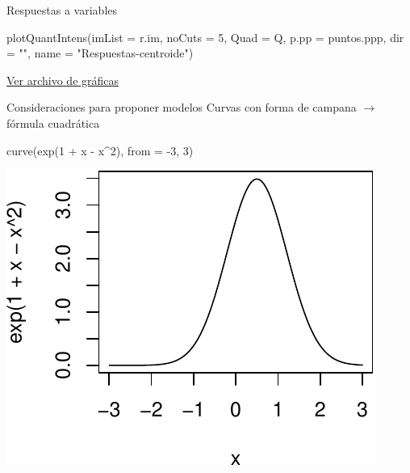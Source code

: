 \documentclass[
  11pt,
  ignorenonframetext,
]{beamer}
\newenvironment{Shaded}{}{}
\newcommand{\AttributeTok}[1]{\textcolor[rgb]{0.49,0.56,0.16}{#1}}
\newcommand{\DecValTok}[1]{\textcolor[rgb]{0.25,0.63,0.44}{#1}}
\newcommand{\FunctionTok}[1]{\textcolor[rgb]{0.02,0.16,0.49}{#1}}
\newcommand{\NormalTok}[1]{#1}
\newcommand{\SpecialCharTok}[1]{\textcolor[rgb]{0.25,0.44,0.63}{#1}}
\newcommand{\StringTok}[1]{\textcolor[rgb]{0.25,0.44,0.63}{#1}}
\begin{document}
\begin{frame}[fragile]{Respuestas a variables}
\protect\hypertarget{respuestas-a-variables}{}
\begin{Shaded}
\begin{Highlighting}[]
\FunctionTok{plotQuantIntens}\NormalTok{(}\AttributeTok{imList =}\NormalTok{ r.im,}
                \AttributeTok{noCuts =} \DecValTok{5}\NormalTok{,}
                \AttributeTok{Quad =}\NormalTok{ Q,}
                \AttributeTok{p.pp =}\NormalTok{ puntos.ppp,}
                \AttributeTok{dir =} \StringTok{""}\NormalTok{,}
                \AttributeTok{name =} \StringTok{"Respuestas{-}centroide"}\NormalTok{)}
\end{Highlighting}
\end{Shaded}

\href{Respuestas-centroide.pdf}{Ver archivo de gráficas}
\end{frame}

\begin{frame}[fragile]{Consideraciones para proponer modelos}
\protect\hypertarget{consideraciones-para-proponer-modelos}{}
Curvas con forma de campana \(\rightarrow\) fórmula cuadrática

\begin{Shaded}
\begin{Highlighting}[]
\FunctionTok{curve}\NormalTok{(}\FunctionTok{exp}\NormalTok{(}\DecValTok{1} \SpecialCharTok{+}\NormalTok{ x }\SpecialCharTok{{-}}\NormalTok{ x}\SpecialCharTok{\^{}}\DecValTok{2}\NormalTok{), }\AttributeTok{from =} \SpecialCharTok{{-}}\DecValTok{3}\NormalTok{, }\DecValTok{3}\NormalTok{)}
\end{Highlighting}
\end{Shaded}

\includegraphics{Tutorial-spatstat-2_files/figure-beamer/unnamed-chunk-11-1.pdf}
\end{frame}
\end{document}
